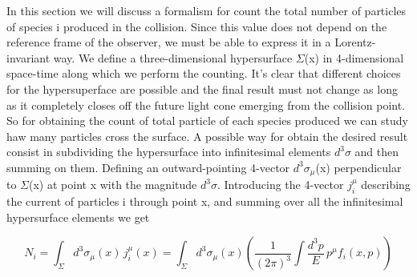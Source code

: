 \documentclass[12pt,a4paper]{book}
\begin{document}
	In this section we will discuss a formalism for count the total number of particles of species i produced in the collision. Since this value does not depend on the reference frame of the observer, we must be able to express it in a Lorentz-invariant way. We define a three-dimensional hypersurface $\Sigma$(x) in 4-dimensional space-time along which we perform the counting. It's clear that different choices for the hypersuperface are possible and the final result must not change as long as it completely closes off the future light cone emerging from the collision point. So for obtaining the count of total particle of each species produced we can study haw many particles cross the surface. A possible way for obtain the desired result consist in subdividing the hypersurface into infinitesimal elements $d^3 \sigma$ and then summing on them. Defining an outward-pointing 4-vector $d^3 \sigma_\mu$(x) perpendicular to $\Sigma$(x) at point x with the magnitude $d^3 \sigma$. Introducing the 4-vector $j^\mu_i$ describing the current of particles i through point x, and summing over all the infinitesimal hypersurface elements we get
	
	\begin{equation}
		\boxed{	N_i = \int_{\Sigma} d^3 \sigma_\mu(x) \, j_i^\mu(x) = \int_{\Sigma} d^3 \sigma_\mu(x) \left( \frac{1}{(2\pi)^3} \int \frac{d^3 p}{E} \, p^\mu f_i(x,p) \right)}
		\label{eq:particle_number}
	\end{equation}
	
\end{document}
